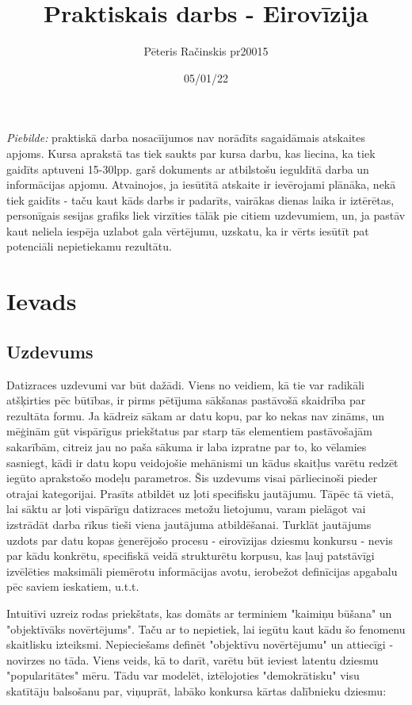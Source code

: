 \documentclass[12pt, a4paper]{article}
\author{Pēteris Račinskis pr20015}
\date{05/01/22}
\begin{document}
\title{Praktiskais darbs - Eirovīzija}

\clearpage
\maketitle
\thispagestyle{empty}
\clearpage
\setcounter{page}{1}
\newpage

\textit{Piebilde:} praktiskā darba nosacīijumos nav norādīts sagaidāmais atskaites apjoms. Kursa aprakstā tas tiek saukts par kursa darbu, kas liecina, ka tiek gaidīts aptuveni 15-30lpp. garš dokuments ar atbilstošu ieguldītā darba un informācijas apjomu. Atvainojos, ja iesūtītā atskaite ir ievērojami plānāka, nekā tiek gaidīts - taču kaut kāds darbs ir padarīts, vairākas dienas laika ir iztērētas, personīgais sesijas grafiks liek virzīties tālāk pie citiem uzdevumiem, un, ja pastāv kaut neliela iespēja uzlabot gala vērtējumu, uzskatu, ka ir vērts iesūtīt pat potenciāli nepietiekamu rezultātu.


\section{Ievads}

\subsection{Uzdevums}
Datizraces uzdevumi var būt dažādi. Viens no veidiem, kā tie var radikāli atšķirties pēc būtības, ir pirms pētījuma sākšanas pastāvošā skaidrība par rezultāta formu. Ja kādreiz sākam ar datu kopu, par ko nekas nav zināms, un mēģinām gūt vispārīgus priekštatus par starp tās elementiem pastāvošajām sakarībām, citreiz jau no paša sākuma ir laba izpratne par to, ko vēlamies sasniegt, kādi ir datu kopu veidojošie mehānismi un kādus skaitļus varētu redzēt iegūto aprakstošo modeļu parametros. Šis uzdevums visai pārliecinoši pieder otrajai kategorijai. Prasīts atbildēt uz ļoti specifisku jautājumu. Tāpēc tā vietā, lai sāktu ar ļoti vispārīgu datizraces metožu lietojumu, varam pielāgot vai izstrādāt darba rīkus tieši viena jautājuma atbildēšanai. Turklāt jautājums uzdots par datu kopas ģenerējošo procesu - eirovīzijas dziesmu konkursu - nevis par kādu konkrētu, specifiskā veidā strukturētu korpusu, kas ļauj patstāvīgi izvēlēties maksimāli piemērotu informācijas avotu, ierobežot definīcijas apgabalu pēc saviem ieskatiem, u.t.t.

Intuitīvi uzreiz rodas priekštats, kas domāts ar terminiem "kaimiņu būšana" un "objektīvāks novērtējums". Taču ar to nepietiek, lai iegūtu kaut kādu šo fenomenu skaitlisku izteiksmi. Nepieciešams definēt "objektīvu novērtējumu" un attiecīgi - novirzes no tāda. Viens veids, kā to darīt, varētu būt ieviest latentu dziesmu "popularitātes" mēru. Tādu var modelēt, iztēlojoties "demokrātisku" visu skatītāju balsošanu par, viņuprāt, labāko konkursa kārtas dalībnieku dziesmu:
\end{document}
